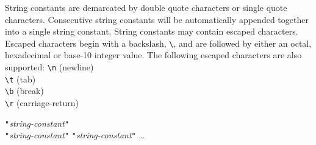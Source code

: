 String constants are demarcated by double quote characters or single
quote characters. Consecutive string constants will be automatically
appended together into a single string constant.
String constants may contain escaped characters. Escaped characters begin with
a backslash, \texttt{\textbackslash}, and are followed by either an octal,
hexadecimal or base-10 integer value. The following escaped characters are also supported:
\startsyn
\texttt{\textbackslash{}n} (newline)\\
\texttt{\textbackslash{}t} (tab)\\
\texttt{\textbackslash{}b} (break)\\
\texttt{\textbackslash{}r} (carriage-return)\\
\stopsyn

\startsyn
\texttt{"}\emph{string-constant}\texttt{"} \\
\texttt{"}\emph{string-constant}\texttt{"} \texttt{"}\emph{string-constant}\texttt{"} \ldots \\
\stopsyn
